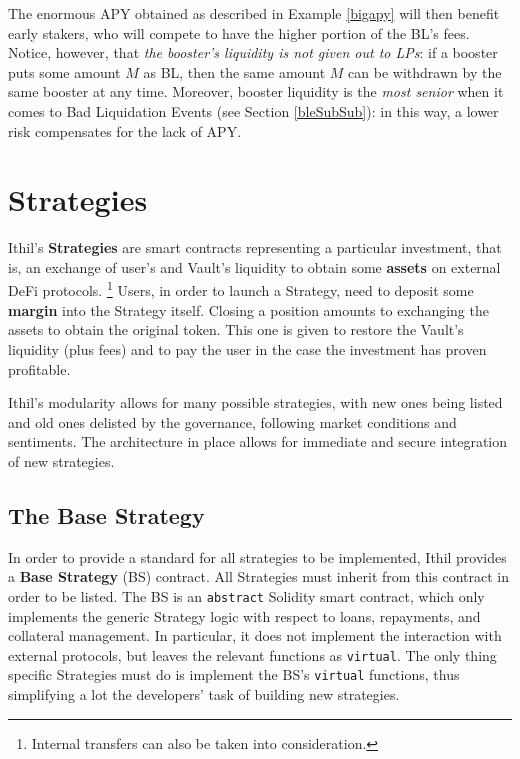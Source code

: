 \documentclass[a4paper,10 pt]{article}
\theoremstyle{definition}
\begin{document}
The enormous APY obtained as described in Example \ref{bigapy} will then benefit early stakers, who will compete to have the higher portion of the BL's fees. Notice, however, that {\it the booster's liquidity is not given out to LPs}: if a booster puts some amount $M$ as BL, then the same amount $M$ can be withdrawn by the same booster at any time. Moreover, booster liquidity is the {\it most senior} when it comes to Bad Liquidation Events (see Section \ref{bleSubSub}): in this way, a lower risk compensates for the lack of APY.

\section{Strategies}\label{stratSec}

Ithil's {\bf Strategies} are smart contracts representing a particular investment, that is, an exchange of user's and Vault's liquidity to obtain some {\bf assets} on external DeFi protocols. \footnote{Internal transfers can also be taken into consideration.} Users, in order to launch a Strategy, need to deposit some {\bf margin} into the Strategy itself. Closing a position amounts to exchanging the assets to obtain the original token. This one is given to restore the Vault's liquidity (plus fees) and to pay the user in the case the investment has proven profitable. 

Ithil's modularity allows for many possible strategies, with new ones being listed and old ones delisted by the governance, following market conditions and sentiments. The architecture in place allows for immediate and secure integration of new strategies.

\subsection{The Base Strategy}\label{asSub}

In order to provide a standard for all strategies to be implemented, Ithil provides a {\bf Base Strategy} (BS) contract. All Strategies must inherit from this contract in order to be listed. The BS is an \verb|abstract| Solidity smart contract, which only implements the generic Strategy logic with respect to loans, repayments, and collateral management. In particular, it does not implement the interaction with external protocols, but leaves the relevant functions as \verb|virtual|. The only thing specific Strategies must do is implement the BS's \verb|virtual| functions, thus simplifying a lot the developers' task of building new strategies.
\end{document}
